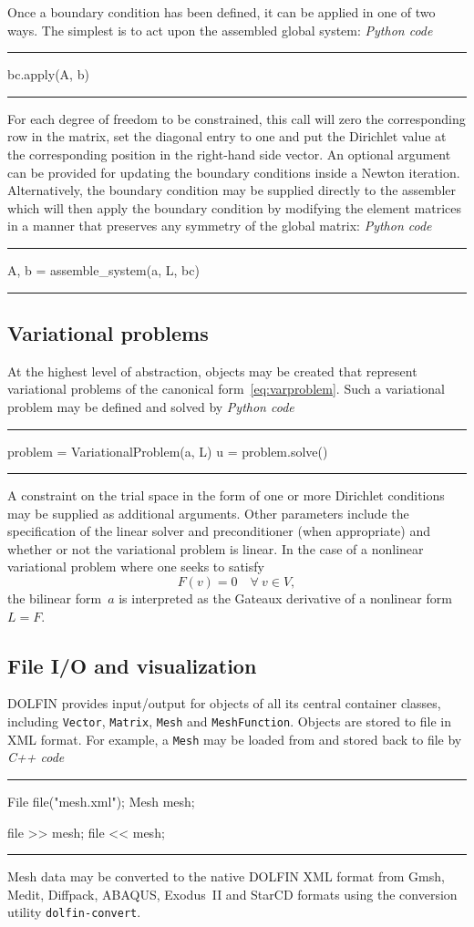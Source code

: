 \documentclass[acmtoms]{acmtrans2m}
\newenvironment{pythoncode}[1]{\center\minipage{#1\textwidth}\footnotesize\hfill\it Python code \rm\vspace{0.1cm}\hrule\renewcommand{\baselinestretch}{0.9}\footnotesize\verbatim}{\endverbatim\hrule\normalsize\endminipage\newline\endcenter}
\newenvironment{cppcode}[1]{\center\minipage{#1\textwidth}\footnotesize\hfill\it C++ code \rm\vspace{0.1cm}\hrule\renewcommand{\baselinestretch}{0.9}\footnotesize\verbatim}{\endverbatim\hrule\normalsize\endminipage\newline\endcenter}
\newcommand{\emp}[1]{\texttt{#1}}
\newcommand{\dolfin}{DOLFIN}
\begin{document}
Once a boundary condition has been defined, it can be applied in one of two
ways. The simplest is to act upon the assembled global system:
\begin{pythoncode}{0.9}
bc.apply(A, b)
\end{pythoncode}
For each degree of freedom to be constrained, this call will zero the
corresponding row in the matrix, set the diagonal entry to one and put
the Dirichlet value at the corresponding position in the right-hand side
vector. An optional argument can be provided for updating the boundary
conditions inside a Newton iteration.  Alternatively, the
boundary condition may be supplied directly to the assembler which
will then apply the boundary condition by modifying the element matrices
in a manner that preserves any symmetry of the global matrix:
\begin{pythoncode}{0.9}
A, b = assemble_system(a, L, bc)
\end{pythoncode}

\subsection{Variational problems}

At the highest level of abstraction, objects may be created that
represent variational problems of the canonical
form~\eqref{eq:varproblem}. Such a variational problem may be defined
and solved by
\begin{pythoncode}{0.9}
problem = VariationalProblem(a, L)
u = problem.solve()
\end{pythoncode}
A constraint on the trial space in the form of one or more Dirichlet
conditions may be supplied as additional arguments. Other parameters
include the specification of the linear solver and preconditioner
(when appropriate) and whether or not the variational problem is
linear. In the case of a nonlinear variational problem where
one seeks to satisfy
\begin{equation}
  F(v) = 0 \quad \forall \ v \in V,
\end{equation}
the bilinear form~$a$ is interpreted as the Gateaux derivative of a
nonlinear form $L=F$.

\subsection{File I/O and visualization}

\dolfin{} provides input/output for objects of all its central
container classes, including \emp{Vector}, \emp{Matrix}, \emp{Mesh} and
\emp{MeshFunction}. Objects are stored to file in XML format. For
example, a \emp{Mesh} may be loaded from and stored back to file by
\begin{cppcode}{0.9}
File file("mesh.xml");
Mesh mesh;

file >> mesh;
file << mesh;
\end{cppcode}
Mesh data may be converted to the native \dolfin{} XML format
from Gmsh, Medit, Diffpack, ABAQUS, Exodus~II and
StarCD formats using the conversion utility \emp{dolfin-convert}.
\end{document}
